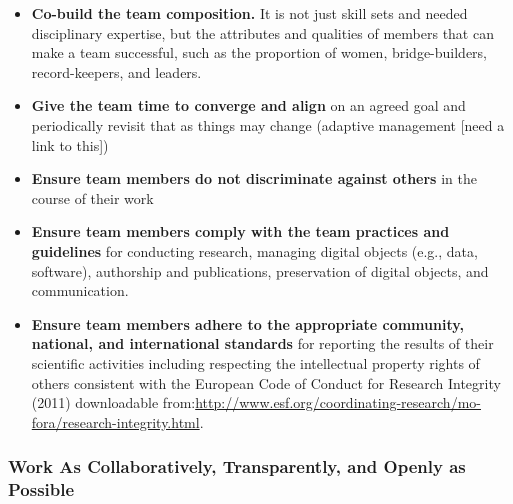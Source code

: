 \documentclass[
  letterpaper,
  DIV=11,
  numbers=noendperiod]{scrreport}
\providecommand{\tightlist}{%
  \setlength{\itemsep}{0pt}\setlength{\parskip}{0pt}}\usepackage{longtable,booktabs,array}
\begin{document}
\begin{itemize}
\tightlist
\item
  \textbf{Co-build the team composition. }It is not just skill sets and
  needed disciplinary expertise, but the attributes and qualities of
  members that can make a team successful, such as the proportion of
  women, bridge-builders, record-keepers, and leaders.
\item
  \textbf{Give the team time to converge and align} on an agreed goal
  and periodically revisit that as things may change (adaptive
  management {[}need a link to this{]})
\item
  \textbf{Ensure team members do not discriminate against others} in the
  course of their work
\item
  \textbf{Ensure team members comply with the team practices and
  guidelines} for conducting research, managing digital objects (e.g.,
  data, software), authorship and publications, preservation of digital
  objects, and communication.\\
\item
  \textbf{Ensure team members adhere to the appropriate community,
  national, and international standards} for reporting the results of
  their scientific activities including respecting the intellectual
  property rights of others consistent with the European Code of Conduct
  for Research Integrity (2011) downloadable
  from:\url{http://www.esf.org/coordinating-research/mo-fora/research-integrity.html}.
\end{itemize}

\hypertarget{work-as-collaboratively-transparently-and-openly-as-possible}{%
\subsubsection{Work As Collaboratively, Transparently, and Openly as
Possible}\label{work-as-collaboratively-transparently-and-openly-as-possible}}
\end{document}
